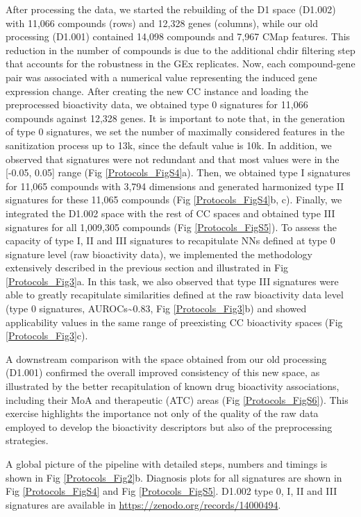 After processing the data, we started the rebuilding of the D1 space (D1.002) with 11,066 compounds (rows) and 12,328 genes (columns), while our old processing (D1.001) contained 14,098 compounds and 7,967 CMap features. This reduction in the number of compounds is due to the additional chdir filtering step that accounts for the robustness in the GEx replicates. Now, each compound-gene pair was associated with a numerical value representing the induced gene expression change. After creating the new CC instance and loading the preprocessed bioactivity data, we obtained type 0 signatures for 11,066 compounds against 12,328 genes. It is important to note that, in the generation of type 0 signatures, we set the number of maximally considered features in the sanitization process up to 13k, since the default value is 10k. In addition, we observed that signatures were not redundant and that most values were in the [-0.05, 0.05] range (Fig \ref{Protocols_FigS4}a). Then, we obtained type I signatures for 11,065 compounds with 3,794 dimensions and generated harmonized type II signatures for these 11,065 compounds (Fig \ref{Protocols_FigS4}b, c). Finally, we integrated the D1.002 space with the rest of CC spaces and obtained type III signatures for all 1,009,305 compounds (Fig \ref{Protocols_FigS5}). To assess the capacity of type I, II and III signatures to recapitulate NNs defined at type 0 signature level (raw bioactivity data), we implemented the methodology extensively described in the previous section and illustrated in Fig \ref{Protocols_Fig3}a. In this task, we also observed that type III signatures were able to greatly recapitulate similarities defined at the raw bioactivity data level (type 0 signatures, AUROCs\textasciitilde0.83, Fig \ref{Protocols_Fig3}b) and showed applicability values in the same range of preexisting CC bioactivity spaces (Fig \ref{Protocols_Fig3}c).

A downstream comparison with the space obtained from our old processing (D1.001) confirmed the overall improved consistency of this new space, as illustrated by the better recapitulation of known drug bioactivity associations, including their MoA and therapeutic (ATC) areas (Fig \ref{Protocols_FigS6}). This exercise highlights the importance not only of the quality of the raw data employed to develop the bioactivity descriptors but also of the preprocessing strategies.

A global picture of the pipeline with detailed steps, numbers and timings is shown in Fig \ref{Protocols_Fig2}b. Diagnosis plots for all signatures are shown in Fig \ref{Protocols_FigS4} and Fig \ref{Protocols_FigS5}. D1.002 type 0, I, II and III signatures are available in \hyperlink{https://zenodo.org/records/14000494}{https://zenodo.org/records/14000494}. 


